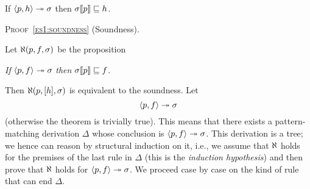 
\begin{theorem}[Soundness]\hfill
\label{es1:soundness}
\begin{center}
If \(\smat{h}{p} \twoheadrightarrow \sigma\) 
then \(\subst{p}{\sigma} \sqsubseteq h\).
\end{center}
\end{theorem}

\medskip

\noindent\textsc{Proof~\ref{es1:soundness}} (Soundness). 

\noindent Let \(\ind{U}(p, f, \sigma)\) be the proposition
\begin{center}
\emph{If} \(\smj{f}{p}{\sigma}\)
\emph{then} \(\subst{p}{\sigma} \sqsubseteq f\).
\end{center}
Then \(\ind{U}(p, [h], \sigma)\) is equivalent to the
soundness. Let
\begin{equation}
  \smj{f}{p}{\sigma} \label{es1:sound:head}
\end{equation}
(otherwise the theorem is trivially true). This means that there
exists a pattern\hyp{}matching derivation \(\Delta\) whose conclusion
is \(\smj{f}{p}{\sigma}\). This derivation is a tree; we
hence can reason by structural induction on it, i.e., we assume that
\(\ind{U}\) holds for the premises of the last rule in \(\Delta\)
(this is the \emph{induction hypothesis}) and then prove that
\(\ind{U}\) holds for \(\smj{f}{p}{\sigma}\). We proceed
case by case on the kind of rule that can end \(\Delta\).
